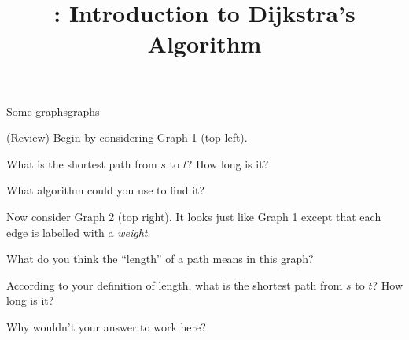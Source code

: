 \documentclass{tufte-handout}
\title{\thecourse: Introduction to Dijkstra's Algorithm}
\date{}
\begin{document}
\maketitle

\begin{model}{Some graphs}{graphs}
  \begin{center}
    
  \end{center}
\end{model}

(Review) Begin by considering Graph 1 (top left).
\begin{questions}
\item What is the shortest path from $s$ to $t$?  How long is it?
\item \label{q:bfs} What algorithm could you use to find it?
\end{questions}

Now consider Graph 2 (top right). It looks just like Graph 1 except that each edge
is labelled with a \emph{weight}.
\begin{questions}
  \item What do you think the ``length'' of a path means in this
    graph?
  \item According to your definition of length, what is the shortest
    path from $s$ to $t$?  How long is it?
  \item Why wouldn't your answer to  work here?
\end{questions}
\end{document}
